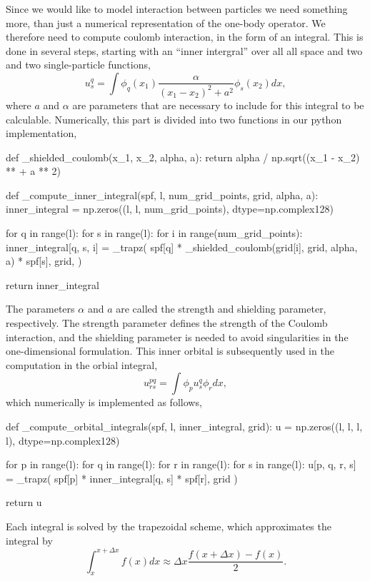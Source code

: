 Since we would like to model interaction between particles we need something more,
than just a numerical representation of the one-body operator. We therefore need to 
compute coulomb interaction, in the form of an integral. This is done in
several steps, starting with an ``inner intergral'' over all all space 
and two and two single-particle functions,
\begin{equation}
   u^q_s = \int \phi_q(x_1) \frac{\alpha}{(x_1-x_2)^2 + a^2}  \phi_s(x_2) dx,
\end{equation}
where $a$ and $\alpha$ are parameters that are necessary to include for this integral 
to be calculable.
Numerically, this part is divided into two functions in our python implementation,
\begin{python}
def _shielded_coulomb(x_1, x_2, alpha, a):
    return alpha / np.sqrt((x_1 - x_2) ** + a ** 2)

def _compute_inner_integral(spf, l, num_grid_points, grid, alpha, a):
    inner_integral = np.zeros((l, l, num_grid_points), dtype=np.complex128)

    for q in range(l):
        for s in range(l):
            for i in range(num_grid_points):
                inner_integral[q, s, i] = _trapz(
                    spf[q]
                    * _shielded_coulomb(grid[i], grid, alpha, a)
                    * spf[s],
                    grid,
                )

    return inner_integral
\end{python}
The parameters $\alpha$ and $a$ are called the strength and shielding parameter, 
respectively. The strength parameter defines the strength of the Coulomb interaction,
and the shielding parameter is needed to avoid singularities in the one-dimensional 
formulation.
This inner orbital is subsequently used in the computation in the orbial integral,
\begin{equation}
    u^{pq}_{rs} = \int \phi_p u^q_s \phi_r dx,
\end{equation}
which numerically is implemented as follows,
\begin{python}
def _compute_orbital_integrals(spf, l, inner_integral, grid):
    u = np.zeros((l, l, l, l), dtype=np.complex128)

    for p in range(l):
        for q in range(l):
            for r in range(l):
                for s in range(l):
                    u[p, q, r, s] = _trapz(
                        spf[p] * inner_integral[q, s] * spf[r], grid
                    )

    return u
\end{python}
Each integral is solved by the trapezoidal scheme, which approximates the integral 
by 
\begin{equation}
    \int_x^{x + \Delta x} f(x) dx \approx \Delta x \frac{f(x + \Delta x) - f(x)}{2}.
\end{equation}

